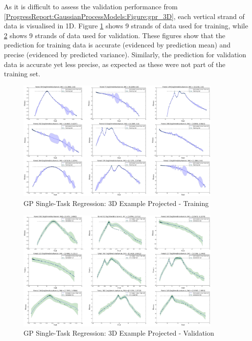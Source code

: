 				\FloatBarrier
				
				As it is difficult to assess the validation performance from \cref{ProgressReport:GaussianProcessModels:Figure:gpr_3D}, each vertical strand of data is visualised in 1D. Figure \ref{ProgressReport:GaussianProcessModels:Figure:gpr_train} shows 9 strands of data used for training, while \cref{ProgressReport:GaussianProcessModels:Figure:gpr_valid} shows 9 strands of data used for validation. These figures show that the prediction for training data is accurate (evidenced by prediction mean) and precise (evidenced by predicted variance). Similarly, the prediction for validation data is accurate yet less precise, as expected as these were not part of the training set.
				
				\begin{figure}[!htbp]
					\centering
						\includegraphics[width=0.9\textwidth]{Figures/Progress/gpr_train.png}
					\caption{GP Single-Task Regression: 3D Example Projected - Training}
					\label{ProgressReport:GaussianProcessModels:Figure:gpr_train}
				\end{figure}

				\begin{figure}[!htbp]
					\centering
						\includegraphics[width=0.9\textwidth]{Figures/Progress/gpr_valid.png}
					\caption{GP Single-Task Regression: 3D Example Projected - Validation}
					\label{ProgressReport:GaussianProcessModels:Figure:gpr_valid}
				\end{figure}
						

